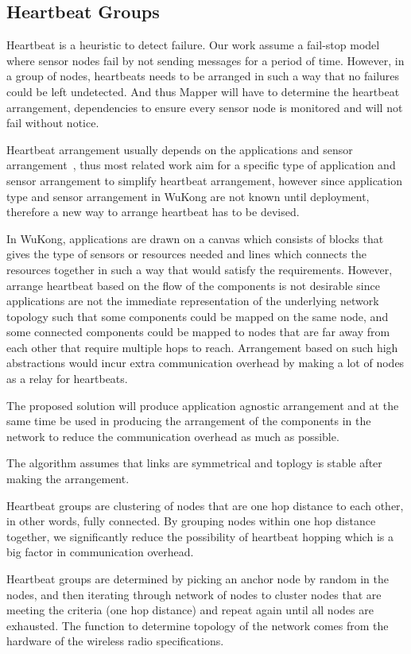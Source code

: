 \subsection{Heartbeat Groups}

Heartbeat is a heuristic to detect failure. Our work assume
a fail-stop model where sensor nodes fail by not sending messages for a period
of time. However, in a group of nodes, heartbeats needs to be arranged in such
a way that no failures could be left undetected. And thus Mapper will have to
determine the heartbeat arrangement, dependencies to ensure every sensor node
is monitored and will not fail without notice.

Heartbeat arrangement usually depends on the applications and sensor
arrangement~\cite{Gobriel2008}, thus most related work aim for a specific type of
application and sensor arrangement to simplify heartbeat arrangement, however
since application type and sensor arrangement in WuKong are not known until
deployment, therefore a new way to arrange heartbeat has to be devised.

In WuKong, applications are drawn on a canvas which consists of blocks that
gives the type of sensors or resources needed and lines which connects the
resources together in such a way that would satisfy the requirements. However,
arrange heartbeat based on the flow of the components is not desirable since
applications are not the immediate representation of the underlying network
topology such that some components could be mapped on the same node, and some
connected components could be mapped to nodes that are far away from each other
that require multiple hops to reach. Arrangement based on such high
abstractions would incur extra communication overhead by making a lot of nodes
as a relay for heartbeats.

The proposed solution will produce application agnostic arrangement and at
the same time be used in producing the arrangement of the components in the
network to reduce the communication overhead as much as possible.

The algorithm assumes that links are symmetrical and toplogy is stable after
making the arrangement.

Heartbeat groups are clustering of nodes
that are one hop distance to each other, in other words, fully connected. By
grouping nodes within one hop distance together, we significantly reduce the
possibility of heartbeat hopping which is a big factor in communication
overhead.

Heartbeat groups are determined by picking an anchor node by random in the
nodes, and then iterating through network of nodes to cluster nodes that are
meeting the criteria (one hop distance) and repeat again until all nodes are
exhausted. The function to determine topology of the network comes from the
hardware of the wireless radio specifications.

